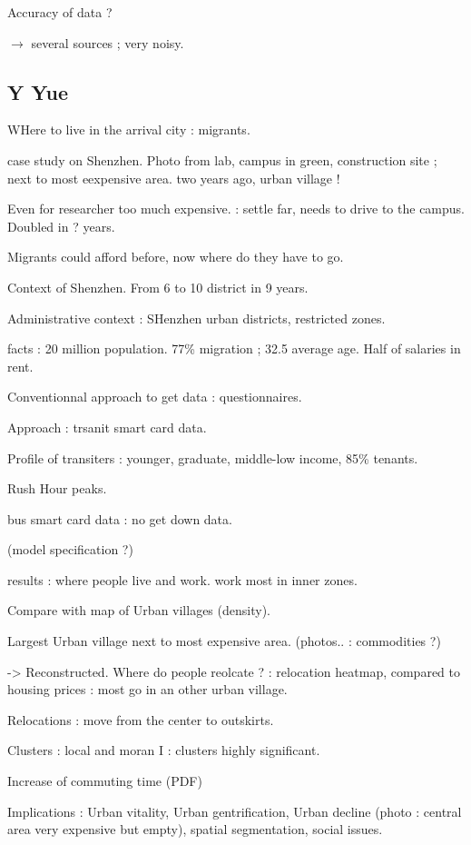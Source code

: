 Accuracy of data ?

$\rightarrow$ several sources ; very noisy.



\subsection*{Y Yue}


WHere to live in the arrival city : migrants.

case study on Shenzhen. Photo from lab, campus in green, construction site ; next to most eexpensive area. two years ago, urban village !

Even for researcher too much expensive. : settle far, needs to drive to the campus. Doubled in ? years.

Migrants could afford before, now where do they have to go.

Context of Shenzhen. From 6 to 10 district in 9 years.

Administrative context : SHenzhen urban districts, restricted zones.

facts : 20 million population. 77\% migration ; 32.5 average age. Half of salaries in rent.

Conventionnal approach to get data : questionnaires.

Approach : trsanit smart card data. 

Profile of transiters : younger, graduate, middle-low income, 85\% tenants.

Rush Hour peaks.

bus smart card data : no get down data.

(model specification ?)

results : where people live and work. work most in inner zones.

Compare with map of Urban villages (density).

Largest Urban village next to most expensive area. (photos.. : commodities ?)

-> Reconstructed. Where do people reolcate ? : relocation heatmap, compared to housing prices : most go in an other urban village.

Relocations : move from the center to outskirts.

Clusters : local and moran I : clusters highly significant.

Increase of commuting time (PDF)

Implications : Urban vitality, Urban gentrification, Urban decline (photo : central area very expensive but empty), spatial segmentation, social issues.

